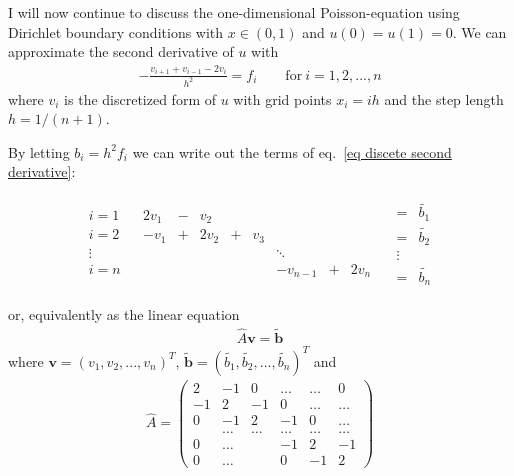 \documentclass[11pt]{article}
\begin{document}
		I will now continue to discuss the one-dimensional Poisson-equation using Dirichlet boundary conditions with $x\in (0, 1)$ and $u(0)=u(1)=0$. We can approximate the second derivative of $u$ with
		\begin{align}
			-\frac{v_{i+1} + v_{i-1} - 2v_i}{h^2} = f_i \qquad \mathrm{for} \ i = 1,2,...,n \label{eq discete second derivative}
		\end{align}
		where $v_i$ is the discretized form of $u$ with grid points $x_i = ih$ and the step length $h=1/(n+1)$.
		
		By letting $b_i = h^2 f_i$ we can write out the terms of eq.~\eqref{eq discete second derivative}:

		\begin{align}
			\begin{matrix}	i=1 		&		&	2v_1		&	-	&	v_2		&		&			&					&		&				\\
									i=2		&		&	-v_1		&	+	&	2v_2		&	+	&	v_3	&					&		&				\\
									\vdots	&		&				&		&				&		&			&	\ddots 		&		&				\\
									i=n		&		&				&		&				&		&			&	-v_{n-1}	&	+	&	2v_n	
			\end{matrix} \quad
			\begin{matrix}
				= & \tilde{b_1} \\
				= & \tilde{b_2} \\
				\vdots & \\
				= & \tilde{b_n}
			\end{matrix}
		\end{align}
		
		or, equivalently as the linear equation
		\begin{align}
			\hat{A}\mathbf{v} = \mathbf{\tilde{b}}
		\end{align}
		where $\mathbf{v} = (v_1, v_2, ..., v_n)^T$, $\mathbf{\tilde{b}} = (\tilde{b_1}, \tilde{b_2}, ..., \tilde{b_n})^T$ and
		\begin{align}
			\hat{A} =
			\begin{pmatrix}
				2	&	-1		&	0		&	\dots		&	\dots		&	0 			\\
				-1	&	2		&	-1		&	0			&	\dots		&	\dots		\\
				0	&	-1		&	2		&	-1			&	0			&	\dots		\\
					&	\dots	&	\dots	&	\dots		&	\dots		&	\dots		\\
				0	&	\dots	&			&	-1			&	2			&	-1			\\
				0	&	\dots	&			&	0			&	-1			&	2
			\end{pmatrix} \label{eq tridiagonal}
		\end{align}
		
\end{document}

